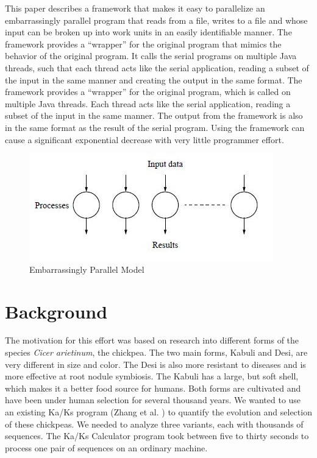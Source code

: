 \documentclass[12pt]{article}
\begin{document}
This paper describes a framework that makes it easy to parallelize an
embarrassingly parallel program that reads from a file, writes to a file and
whose input can be broken up into work units in an easily identifiable manner.
The framework provides a ``wrapper'' for the original program that mimics the
behavior of the original program. It calls the serial programs on multiple Java
threads, such that each thread acts like the serial application, reading a
subset of the input in the same manner and creating the output in the same
format. The framework provides a ``wrapper'' for the original program, which is
called on multiple Java threads. Each thread acts like the serial application,
reading a subset of the input in the same manner. The output from the framework
is also in the same format as the result of the serial program. Using the
framework can cause a significant exponential decrease with very little
programmer effort. 

\begin{figure}
    \begin{center}
        \includegraphics{figures/ep.jpg}
    \end{center}
    \caption{Embarrassingly Parallel Model}
    \label{fig:ep}
\end{figure}

\section{Background}

The motivation for this effort was based on research into different forms of the
species \emph{Cicer arietinum}, the chickpea. The two main forms, Kabuli and
Desi, are very different in size and color. The Desi is also more resistant to
diseases and is more effective at root nodule symbiosis. The Kabuli has a large,
but soft shell, which makes it a better food source for humans. Both forms are
cultivated and have been under human selection for several thousand years. We
wanted to use an existing Ka/Ks program (Zhang et al. \cite{kaks}) to quantify
the evolution and selection of these chickpeas. We needed to analyze three
variants, each with thousands of sequences. The Ka/Ks Calculator program took
between five to thirty seconds to process one pair of sequences on an ordinary
machine.
\end{document}
